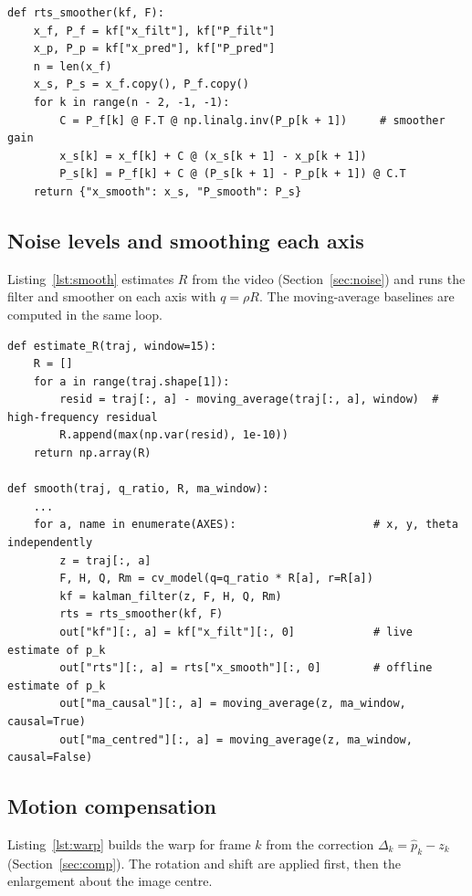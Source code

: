 \documentclass[11pt,a4paper]{article}
\begin{document}
\begin{lstlisting}[caption={Rauch--Tung--Striebel backward pass (\texttt{kalman.py}).},label=lst:rts]
def rts_smoother(kf, F):
    x_f, P_f = kf["x_filt"], kf["P_filt"]
    x_p, P_p = kf["x_pred"], kf["P_pred"]
    n = len(x_f)
    x_s, P_s = x_f.copy(), P_f.copy()
    for k in range(n - 2, -1, -1):
        C = P_f[k] @ F.T @ np.linalg.inv(P_p[k + 1])     # smoother gain
        x_s[k] = x_f[k] + C @ (x_s[k + 1] - x_p[k + 1])
        P_s[k] = P_f[k] + C @ (P_s[k + 1] - P_p[k + 1]) @ C.T
    return {"x_smooth": x_s, "P_smooth": P_s}
\end{lstlisting}

\subsection{Noise levels and smoothing each axis}
Listing~\ref{lst:smooth} estimates $R$ from the video (Section~\ref{sec:noise}) and runs the
filter and smoother on each axis with $q = \rho R$. The moving-average baselines are computed
in the same loop.

\begin{lstlisting}[caption={Estimating $R$ and smoothing each axis (\texttt{stabilize.py}).},label=lst:smooth]
def estimate_R(traj, window=15):
    R = []
    for a in range(traj.shape[1]):
        resid = traj[:, a] - moving_average(traj[:, a], window)  # high-frequency residual
        R.append(max(np.var(resid), 1e-10))
    return np.array(R)

def smooth(traj, q_ratio, R, ma_window):
    ...
    for a, name in enumerate(AXES):                     # x, y, theta independently
        z = traj[:, a]
        F, H, Q, Rm = cv_model(q=q_ratio * R[a], r=R[a])
        kf = kalman_filter(z, F, H, Q, Rm)
        rts = rts_smoother(kf, F)
        out["kf"][:, a] = kf["x_filt"][:, 0]            # live estimate of p_k
        out["rts"][:, a] = rts["x_smooth"][:, 0]        # offline estimate of p_k
        out["ma_causal"][:, a] = moving_average(z, ma_window, causal=True)
        out["ma_centred"][:, a] = moving_average(z, ma_window, causal=False)
\end{lstlisting}

\subsection{Motion compensation}
Listing~\ref{lst:warp} builds the warp for frame $k$ from the correction
$\Delta_k = \hat p_k - z_k$ (Section~\ref{sec:comp}). The rotation and shift are applied first,
then the enlargement about the image centre.
\end{document}
